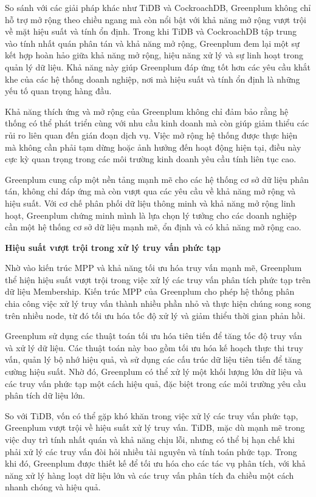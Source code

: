 \documentclass{article}[14pt]
\begin{document}
So sánh với các giải pháp khác như TiDB và CockroachDB, Greenplum không chỉ hỗ trợ mở rộng theo chiều ngang mà còn nổi bật với khả năng mở rộng vượt trội về mặt hiệu suất và tính ổn định. Trong khi TiDB và CockroachDB tập trung vào tính nhất quán phân tán và khả năng mở rộng, Greenplum đem lại một sự kết hợp hoàn hảo giữa khả năng mở rộng, hiệu năng xử lý và sự linh hoạt trong quản lý dữ liệu. Khả năng này giúp Greenplum đáp ứng tốt hơn các yêu cầu khắt khe của các hệ thống doanh nghiệp, nơi mà hiệu suất và tính ổn định là những yếu tố quan trọng hàng đầu.

Khả năng thích ứng và mở rộng của Greenplum không chỉ đảm bảo rằng hệ thống có thể phát triển cùng với nhu cầu kinh doanh mà còn giúp giảm thiểu các rủi ro liên quan đến gián đoạn dịch vụ. Việc mở rộng hệ thống được thực hiện mà không cần phải tạm dừng hoặc ảnh hưởng đến hoạt động hiện tại, điều này cực kỳ quan trọng trong các môi trường kinh doanh yêu cầu tính liên tục cao.

Greenplum cung cấp một nền tảng mạnh mẽ cho các hệ thống cơ sở dữ liệu phân tán, không chỉ đáp ứng mà còn vượt qua các yêu cầu về khả năng mở rộng và hiệu suất. Với cơ chế phân phối dữ liệu thông minh và khả năng mở rộng linh hoạt, Greenplum chứng minh mình là lựa chọn lý tưởng cho các doanh nghiệp cần một hệ thống cơ sở dữ liệu mạnh mẽ, ổn định và có khả năng mở rộng cao.



\textbf{Hiệu suất vượt trội trong xử lý truy vấn phức tạp}

Nhờ vào kiến trúc MPP và khả năng tối ưu hóa truy vấn mạnh mẽ, Greenplum thể hiện hiệu suất vượt trội trong việc xử lý các truy vấn phân tích phức tạp trên dữ liệu Membership. Kiến trúc MPP của Greenplum cho phép hệ thống phân chia công việc xử lý truy vấn thành nhiều phần nhỏ và thực hiện chúng song song trên nhiều node, từ đó tối ưu hóa tốc độ xử lý và giảm thiểu thời gian phản hồi.

Greenplum sử dụng các thuật toán tối ưu hóa tiên tiến để tăng tốc độ truy vấn và xử lý dữ liệu. Các thuật toán này bao gồm tối ưu hóa kế hoạch thực thi truy vấn, quản lý bộ nhớ hiệu quả, và sử dụng các cấu trúc dữ liệu tiên tiến để tăng cường hiệu suất. Nhờ đó, Greenplum có thể xử lý một khối lượng lớn dữ liệu và các truy vấn phức tạp một cách hiệu quả, đặc biệt trong các môi trường yêu cầu phân tích dữ liệu lớn.

So với TiDB, vốn có thể gặp khó khăn trong việc xử lý các truy vấn phức tạp, Greenplum vượt trội về hiệu suất xử lý truy vấn. TiDB, mặc dù mạnh mẽ trong việc duy trì tính nhất quán và khả năng chịu lỗi, nhưng có thể bị hạn chế khi phải xử lý các truy vấn đòi hỏi nhiều tài nguyên và tính toán phức tạp. Trong khi đó, Greenplum được thiết kế để tối ưu hóa cho các tác vụ phân tích, với khả năng xử lý hàng loạt dữ liệu lớn và các truy vấn phân tích đa chiều một cách nhanh chóng và hiệu quả.
\end{document}
